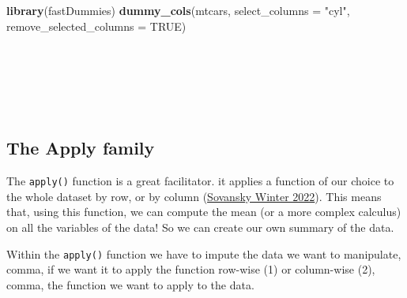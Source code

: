 \documentclass[
]{article}
\newenvironment{Shaded}{\begin{snugshade}}{\end{snugshade}}
\newcommand{\AttributeTok}[1]{\textcolor[rgb]{0.13,0.29,0.53}{#1}}
\newcommand{\ConstantTok}[1]{\textcolor[rgb]{0.56,0.35,0.01}{#1}}
\newcommand{\FunctionTok}[1]{\textcolor[rgb]{0.13,0.29,0.53}{\textbf{#1}}}
\newcommand{\NormalTok}[1]{#1}
\newcommand{\StringTok}[1]{\textcolor[rgb]{0.31,0.60,0.02}{#1}}
\begin{document}
\begin{Shaded}
\begin{Highlighting}[]
\FunctionTok{library}\NormalTok{(fastDummies)}
\FunctionTok{dummy\_cols}\NormalTok{(mtcars, }\AttributeTok{select\_columns =} \StringTok{"cyl"}\NormalTok{, }\AttributeTok{remove\_selected\_columns =} \ConstantTok{TRUE}\NormalTok{)}
\end{Highlighting}
\end{Shaded}

~

~

~

\hypertarget{the-apply-family}{%
\subsection{The Apply family}\label{the-apply-family}}

The \texttt{apply()} function is a great facilitator. it applies a function of
our choice to the whole dataset by row, or by column
(\protect\hyperlink{ref-sovanskywinter2022}{Sovansky Winter 2022}). This means that, using this function, we can
compute the mean (or a more complex calculus) on all the variables of
the data! So we can create our own summary of the data.

Within the \texttt{apply()} function we have to impute the data we want to
manipulate, comma, if we want it to apply the function row-wise (1) or
column-wise (2), comma, the function we want to apply to the data.
\end{document}
